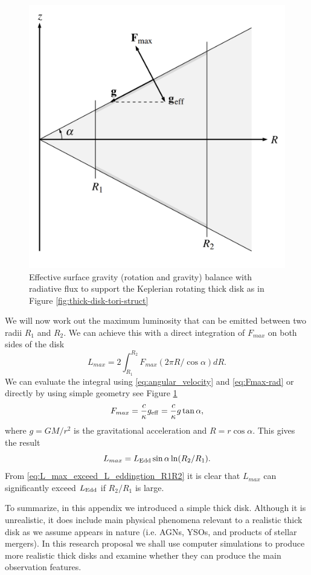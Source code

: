 \documentclass[modern]{aastex62}
\begin{document}
%
\begin{figure}[t!]
\includegraphics[width=\linewidth]{simple_geometry_geff_Lmax.png}
\caption{Effective surface gravity (rotation and gravity) balance with radiative flux to support the Keplerian rotating thick disk as in Figure \ref{fig:thick-disk-tori-struct} }\label{fig:simple_geometry_geff_Lmax}
\end{figure}
%
We will now work out the maximum luminosity that can be emitted between two radii $R_1$ and $R_2$. We can achieve this with a direct integration of $F_{max}$ on both sides of the disk
\begin{equation}
    L_{max}=2\int_{R_1}^{R_2} F_{max} (2\pi R/\cos\alpha) dR .
\end{equation}
We can evaluate the integral using \ref{eq:angular_velocity} and \ref{eq:Fmax-rad} or directly by using simple geometry see Figure \ref{fig:simple_geometry_geff_Lmax}
\begin{equation}
    F_{max}=\frac{c}{\kappa} g_{\rm{eff}} = \frac{c}{\kappa}g\tan\alpha,
\end{equation}
where $g=GM/r^2$ is the gravitational acceleration and $R=r\cos\alpha$.
This gives the result
\begin{equation} \label{eq:L_max_exceed_L_eddingtion_R1R2}
    L_{max}=L_{\rm{Edd}}\sin\alpha \ln (R_2/R_1).
\end{equation}
From \ref{eq:L_max_exceed_L_eddingtion_R1R2} it is clear that $L_{max}$ can significantly exceed $L_{\rm{Edd}}$ if $R_2/R_1$ is large. 

To summarize, in this appendix we introduced a simple thick disk. Although it is unrealistic, it does include main physical phenomena relevant to a realistic thick disk as we assume appears in nature (i.e. AGNs, YSOs, and products of stellar mergers).
In this research proposal we shall use computer simulations to produce more realistic thick disks and examine whether they can produce the main observation features.


\newpage
%

\end{document}

